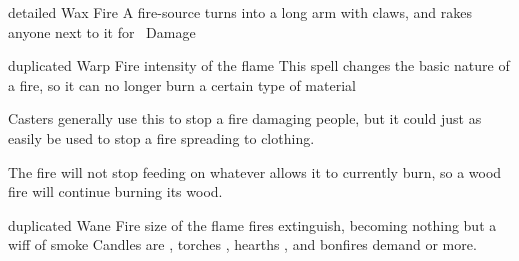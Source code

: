   {detailed}%
  {Wax}%
  {Fire}%
  {}%
  {A fire-source turns into a long arm with claws, and rakes anyone next to it for \showDam~Damage}%
  {}

  {duplicated}%
  {Warp}%
  {Fire}%
  {intensity of the flame}%
  {This spell changes the basic nature of a fire, so it can no longer burn a certain type of material}%
  {Casters generally use this to stop a fire damaging people, but it could just as easily be used to stop a fire spreading to clothing.

    The fire will not stop feeding on whatever allows it to currently burn, so a wood fire will continue burning its wood.}

  {duplicated}%
  {Wane}%
  {Fire}%
  {size of the flame}%
  { fires extinguish, becoming nothing but a wiff of smoke}%
  {Candles are \tn[6], torches \tn[7], hearths \tn[8], and bonfires demand \tn[9] or more.}
